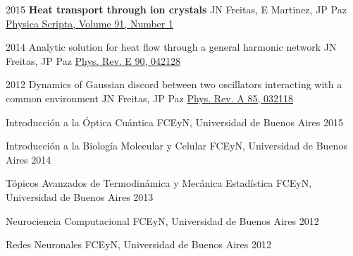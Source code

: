 \begin{cvpubs}
\cvpub
    {2015}
    {\bf Heat transport through ion crystals}
    {JN Freitas, E Martinez, JP Paz}
    {\href{http://iopscience.iop.org/article/10.1088/0031-8949/91/1/013007/meta}{Physica Scripta, Volume 91, Number 1}}

\cvpub
    {2014}
    {Analytic solution for heat flow through a general harmonic network}
    {JN Freitas, JP Paz}
    {\href{http://journals.aps.org/pre/abstract/10.1103/PhysRevE.90.042128}{Phys. Rev. E 90, 042128}}

\cvpub
    {2012}
    {Dynamics of Gaussian discord between two oscillators interacting with a common environment}
    {JN Freitas, JP Paz}
    {\href{http://pra.aps.org/abstract/PRA/v85/i3/e032118}{Phys. Rev. A 85, 032118}}

\end{cvpubs}


\begin{cvhonors}

  \cvhonor
    {Introducción a la Óptica Cuántica}
    {FCEyN, Universidad de Buenos Aires} %
    {} %
    {2015} %

  \cvhonor
    {Introducción a la Biología Molecular y Celular}
    {FCEyN, Universidad de Buenos Aires}
    {}
    {2014}

  \cvhonor
    {Tópicos Avanzados de Termodinámica y Mecánica Estadística}
    {FCEyN, Universidad de Buenos Aires}
    {}
    {2013}

  \cvhonor
    {Neurociencia Computacional}
    {FCEyN, Universidad de Buenos Aires}
    {}
    {2012}

  \cvhonor
    {Redes Neuronales}
    {FCEyN, Universidad de Buenos Aires}
    {}
    {2012}

\end{cvhonors}
